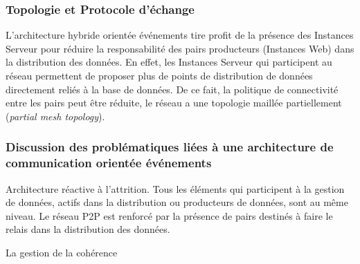 \subsubsection{Topologie et Protocole d'échange}
L'architecture hybride orientée \og événements\fg{} tire profit de la présence des 
Instances Serveur pour réduire la responsabilité des pairs producteurs (Instances 
Web) dans la distribution des données. En effet, les Instances Serveur qui 
participent au réseau permettent de proposer plus de points de distribution de 
données directement reliés à la base de données. De ce fait, la politique de 
connectivité entre les pairs peut être réduite, le réseau a une topologie maillée partiellement (\textit{partial mesh topology}). 

\subsubsection{Discussion des problématiques liées à une architecture de 
communication orientée \og événements\fg{}}
Architecture réactive à l'attrition. Tous les éléments qui participent à la gestion de 
données, actifs dans la distribution ou producteurs de données, sont au même 
niveau. Le réseau \gls{P2P} est renforcé par la présence de pairs destinés à 
faire le relais dans la distribution des données. 

La gestion de la cohérence 


%
%
%





